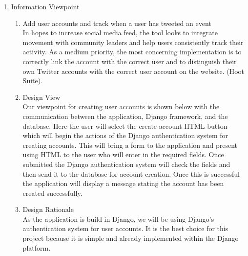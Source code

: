 \documentclass[draftclsnofoot,10pt,onecolumn]{IEEEtran} %
\begin{document}
\begin{enumerate}
\begin{enumerate}
		\item Information Viewpoint \\
			\begin{enumerate}
				\item Add user accounts and track when a user has tweeted an event \\
				In hopes to increase social media feed, the tool looks to integrate movement with community leaders and
				help users consistently track their activity. As a medium priority, the most concerning implementation is to
				correctly link the account with the correct user and to distinguish their own Twitter accounts with the
				correct user account on the website. (Hoot Suite). \\
				
				\item Design View \\ %
				Our viewpoint for creating user accounts is shown below with the communication between the application,
				Django framework, and the database. Here the user will select the create account HTML button which will
				begin the actions of the Django authentication system for creating accounts. This will bring a form to the
				application and present using HTML to the user who will enter in the required fields. Once submitted the
				Django authentication system will check the fields and then send it to the database for account creation.
				Once this is successful the application will display a message stating the account has been created
				successfully. \\
				
				\item Design Rationale \\
				As the application is build in Django, we will be using Django's authentication system for user accounts. It
				is the best choice for this project because it is simple and already implemented within the Django platform. \\
			\end{enumerate}
			

\end{enumerate}
\end{enumerate}
\end{document}
